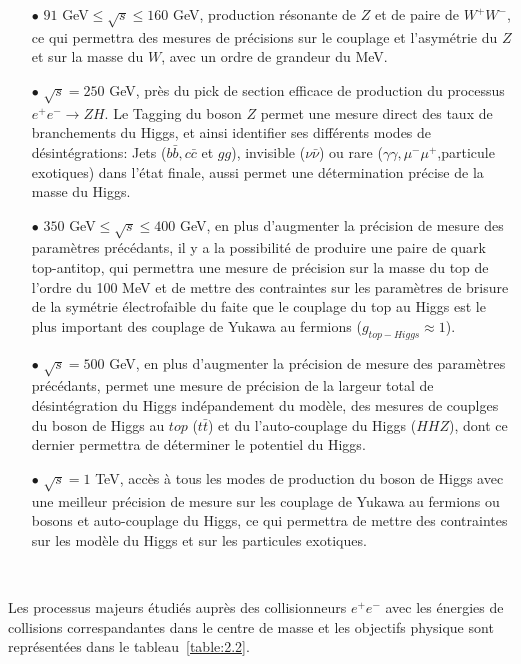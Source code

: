 \begin{itemize}
\item[$\bullet$] $91$ GeV${\leq}\sqrt{s}{\leq}160$ GeV, production r\'esonante de $Z$ et de paire de $W^+W^-$, ce qui permettra des mesures de pr\'ecisions sur le couplage et l'asym\'etrie du $Z$ et sur la masse du $W$, avec un ordre de grandeur du MeV.\\
\item[$\bullet$] $\sqrt{s}=250$ GeV, pr\`es du pick de section efficace de production du processus $e^{+}e^{-}{\rightarrow}ZH$. Le Tagging du boson $Z$ permet une mesure direct des taux de branchements du Higgs, et ainsi identifier ses diff\'erents modes de d\'esint\'egrations: Jets ($b\bar{b},c\bar{c}$ et $gg$), invisible ($\nu{\bar{\nu}}$) ou rare ($\gamma\gamma,\mu^-\mu^+$,particule exotiques) dans l'\'etat finale, aussi permet une d\'etermination pr\'ecise de la masse du Higgs.\\
\item[$\bullet$] $350$ GeV${\leq}\sqrt{s}{\leq}400$ GeV, en plus d'augmenter la pr\'ecision de mesure des param\`etres pr\'ec\'edants, il y a la possibilit\'e de produire une paire de quark top-antitop, qui permettra une mesure de pr\'ecision sur la masse du top de l'ordre du 100 MeV et de mettre des contraintes sur les param\`etres de brisure de la sym\'etrie \'electrofaible du faite que le couplage du top au Higgs est le plus important des couplage de Yukawa au fermions ($g_{top-Higgs}\approx1$).\\
\item[$\bullet$] $\sqrt{s}=500$ GeV, en plus d'augmenter la pr\'ecision de mesure des param\`etres pr\'ec\'edants, permet une mesure de pr\'ecision de la largeur total de d\'esint\'egration du Higgs ind\'epandement du mod\`ele, des mesures de couplges du boson de Higgs au $top$ ($t\bar{t}$) et du l'auto-couplage du Higgs ($HHZ$), dont ce dernier permettra de d\'eterminer le potentiel du Higgs.\\
\item[$\bullet$] $\sqrt{s}=1$ TeV, acc\`es à tous les modes de production du boson de Higgs avec une meilleur pr\'ecision de mesure sur les couplage de Yukawa au fermions ou bosons et auto-couplage du Higgs, ce qui permettra de mettre des contraintes sur les mod\`ele du Higgs et sur les particules exotiques.
\end{itemize}
~\par Les processus majeurs \'etudiés aupr\`es des collisionneurs $e^+e^-$ avec les \'energies de collisions correspandantes dans le centre de masse et les objectifs physique sont repr\'esent\'ees dans le tableau~\ref{table:2.2}. 

